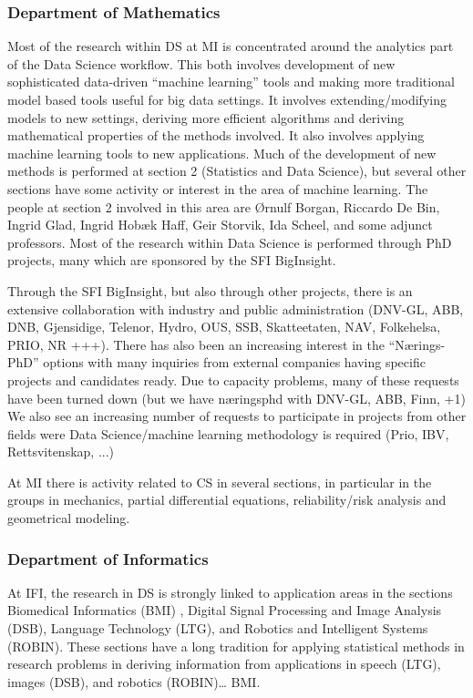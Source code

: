 \documentclass[a4paper,10pt]{article}
\begin{document}
\subsubsection*{Department of Mathematics}
Most of the research within DS at MI is concentrated around the analytics part of the Data Science workflow. This both involves development of new sophisticated data-driven “machine learning” tools and making more traditional model based tools useful for big data settings. It involves extending/modifying models to new settings, deriving more efficient algorithms and deriving mathematical properties of the methods involved. It also involves applying machine learning tools to new applications. Much of the development of new methods is performed at section 2 (Statistics and Data Science), but several other sections have some activity or interest in the area of machine learning. The people at section 2 involved in this area are  Ørnulf Borgan, Riccardo De Bin, Ingrid Glad, Ingrid Hobæk Haff, Geir Storvik, Ida Scheel, and some adjunct professors. 
Most of the research within Data Science is performed through PhD projects, many which are sponsored by the SFI BigInsight. 

Through the SFI BigInsight, but also through other projects, there is an extensive collaboration with industry and public administration (DNV-GL, ABB, DNB, Gjensidige, Telenor, Hydro, OUS, SSB, Skatteetaten, NAV, Folkehelsa, PRIO, NR +++).
There has also been an increasing interest in the “Nærings-PhD” options with many inquiries from external companies having specific projects and candidates ready. Due to capacity problems, many of these requests have been turned down (but we have næringsphd with DNV-GL, ABB, Finn, +1)
We also see an increasing number of requests to participate in projects from other fields were Data Science/machine learning methodology is required (Prio, IBV, Rettsvitenskap, ...) 

At MI there is activity related to CS in several sections, in particular in the groups in mechanics, partial differential equations, reliability/risk analysis and geometrical modeling. 


\subsubsection*{Department of Informatics}
	 	 	 	
At IFI, the research in DS is strongly linked to application areas in the sections Biomedical Informatics (BMI) , Digital Signal Processing and Image Analysis (DSB), Language Technology (LTG), and Robotics and Intelligent Systems (ROBIN). These sections have a long tradition for applying statistical methods in research problems in deriving information from applications in speech (LTG), images (DSB), and robotics (ROBIN)… BMI.
\end{document}
